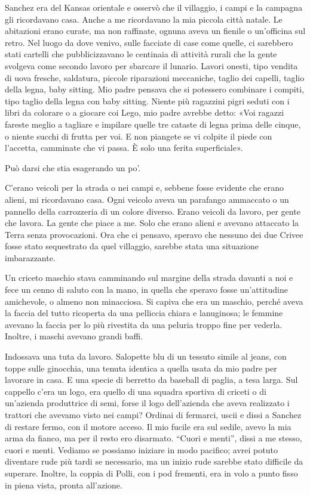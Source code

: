Sanchez era del Kansas orientale e osservò che il villaggio, i campi e
la campagna gli ricordavano casa. Anche a me ricordavano la mia piccola
città natale. Le abitazioni erano curate, ma non raffinate, ognuna aveva
un fienile o un'officina sul retro. Nel luogo da dove venivo, sulle
facciate di case come quelle, ci sarebbero stati cartelli che
pubblicizzavano le centinaia di attività rurali che la gente svolgeva
come secondo lavoro per sbarcare il lunario. Lavori onesti, tipo vendita
di uova fresche, saldatura, piccole riparazioni meccaniche, taglio dei
capelli, taglio della legna, baby sitting. Mio padre pensava che si
potessero combinare i compiti, tipo taglio della legna con baby sitting.
Niente più ragazzini pigri seduti con i libri da colorare o a giocare
coi Lego, mio padre avrebbe detto: «Voi ragazzi fareste meglio a
tagliare e impilare quelle tre cataste di legna prima delle cinque, o
niente succhi di frutta per voi. E non piangete se vi colpite il piede
con l'accetta, camminate che vi passa. È solo una ferita superficiale».

Può darsi che stia esagerando un po'.

C'erano veicoli per la strada o nei campi e, sebbene fosse evidente che
erano alieni, mi ricordavano casa. Ogni veicolo aveva un parafango
ammaccato o un pannello della carrozzeria di un colore diverso. Erano
veicoli da lavoro, per gente che lavora. La gente che piace a me. Solo
che erano alieni e avevano attaccato la Terra senza provocazioni. Ora
che ci pensavo, speravo che nessuno dei due Crivee fosse stato
sequestrato da quel villaggio, sarebbe stata una situazione
imbarazzante.

Un criceto maschio stava camminando sul margine della strada davanti a
noi e fece un cenno di saluto con la mano, in quella che speravo fosse
un'attitudine amichevole, o almeno non minacciosa. Si capiva che era un
maschio, perché aveva la faccia del tutto ricoperta da una pelliccia
chiara e lanuginosa; le femmine avevano la faccia per lo più rivestita
da una peluria troppo fine per vederla. Inoltre, i maschi avevano grandi
baffi.

Indossava una tuta da lavoro. Salopette blu di un tessuto simile al
jeans, con toppe sulle ginocchia, una tenuta identica a quella usata da
mio padre per lavorare in casa. E una specie di berretto da baseball di
paglia, a tesa larga. Sul cappello c'era un logo, era quello di una
squadra sportiva di criceti o di un'azienda produttrice di semi, forse
il logo dell'azienda che aveva realizzato i trattori che avevamo visto
nei campi? Ordinai di fermarci, uscii e dissi a Sanchez di restare
fermo, con il motore acceso. Il mio fucile era sul sedile, avevo la mia
arma da fianco, ma per il resto ero disarmato. ``Cuori e menti'', dissi
a me stesso, cuori e menti. Vediamo se possiamo iniziare in modo
pacifico; avrei potuto diventare rude più tardi se necessario, ma un
inizio rude sarebbe stato difficile da superare. Inoltre, la coppia di
Polli, con i pod frementi, era in volo a punto fisso in piena vista,
pronta all'azione.

